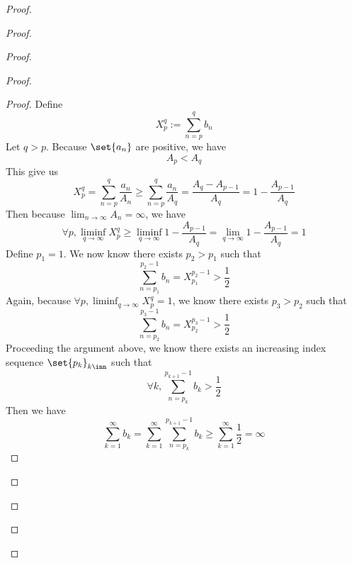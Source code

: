 \documentclass{report}
\begin{document}
\begin{proof}
\begin{proof}
\begin{proof}
\begin{proof}
\begin{proof}
Define
\begin{equation*}
X^q_p:=\sum_{n=p}^q b_n
\end{equation*}
Let $q>p$. Because  $\set{a_n}$ are positive, we have 
\begin{equation*}
A_p<A_q
\end{equation*}
This give us
\begin{equation*}
X_p^q=\sum_{n=p}^q \frac{a_n}{A_n}\geq \sum_{n=p}^q \frac{a_n}{A_q}=\frac{A_q-A_{p-1}}{A_q}=1-\frac{A_{p-1}}{A_q}
\end{equation*}
Then because $\lim_{n\to\infty}A_n=\infty$, we have
\begin{equation*}
\forall p,\liminf_{q\to\infty}X_p^q\geq \liminf_{q\to\infty} 1-\frac{A_{p-1}}{A_q} =\lim_{q\to\infty}1-\frac{A_{p-1}}{A_q}=1
\end{equation*}
Define $p_1=1$. We now know there exists $p_2>p_1$ such that
\begin{equation*}
\sum_{n=p_1}^{p_2-1} b_n= X_{p_1}^{p_2-1}>\frac{1}{2}
\end{equation*}
Again, because $\forall p,\liminf_{q\to\infty} X_p^q=1$, we know there exists $p_3>p_2$ such that
 \begin{equation*}
\sum_{n=p_2}^{p_3-1} b_n=X_{p_2}^{p_3-1} >\frac{1}{2}
\end{equation*}
Proceeding the argument above, we know there exists an increasing index sequence $\set{p_k}_{k\inn}$ such that 
\begin{equation*}
\forall k,\sum_{n=p_k}^{p_{k+1}-1} b_k>\frac{1}{2}
\end{equation*}
Then we have
\begin{equation*}
\sum_{k=1}^\infty b_k=  \sum_{k=1}^\infty \sum_{n=p_k}^{p_{k+1}-1} b_k\geq \sum_{k=1}^\infty \frac{1}{2}=\infty
\end{equation*}

\end{proof}


\end{proof}
\end{proof}
\end{proof}
\end{proof}
\end{document}
